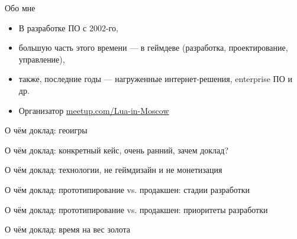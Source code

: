 \documentclass[aspectratio=169,handout,bigger]{beamer}
\begin{document}
\begin{frame}{Обо мне}

\begin{itemize}
\item В разработке ПО с 2002-го,
\item большую часть этого времени --- в геймдеве (разработка, проектирование, управление),
\item также, последние годы --- нагруженные интернет-решения, enterprise ПО и др.
\item Организатор \href{http://meetup.com/Lua-in-Moscow}{meetup.com/Lua-in-Moscow}
\end{itemize}

\end{frame}


\begin{frame}{О чём доклад: геоигры}
\end{frame}


\begin{frame}{О чём доклад: конкретный кейс, очень ранний, зачем доклад?}
\end{frame}


\begin{frame}{О чём доклад: технологии, не геймдизайн и не монетизация}
\end{frame}


\begin{frame}{О чём доклад: прототипирование vs. продакшен: стадии разработки}
\end{frame}


\begin{frame}{О чём доклад: прототипирование vs. продакшен: приоритеты разработки}
\end{frame}


\begin{frame}{О чём доклад: время на вес золота}
\end{frame}
\end{document}
